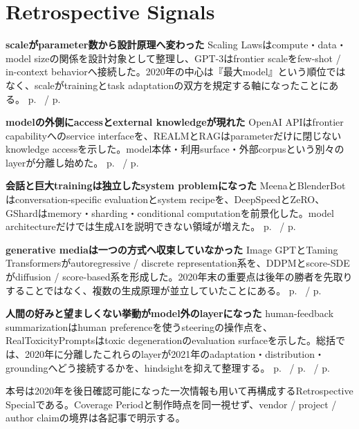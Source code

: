 \section*{Retrospective Signals}
\smallskip
\noindent \textbf{scaleがparameter数から設計原理へ変わった} Scaling Lawsはcompute・data・model sizeの関係を設計対象として整理し、GPT-3はfrontier scaleをfew-shot / in-context behaviorへ接続した。2020年の中心は『最大model』という順位ではなく、scaleがtrainingとtask adaptationの双方を規定する軸になったことにある。 \hfill{\footnotesize p.~\pageref{pkg:scale-laws-gpt3} / p.~\pageref{pkg:systems-scale}}
\par
\smallskip
\noindent \textbf{modelの外側にaccessとexternal knowledgeが現れた} OpenAI APIはfrontier capabilityへのservice interfaceを、REALMとRAGはparameterだけに閉じないknowledge accessを示した。model本体・利用surface・外部corpusという別々のlayerが分離し始めた。 \hfill{\footnotesize p.~\pageref{pkg:access-api} / p.~\pageref{pkg:retrieval-grounding}}
\par
\smallskip
\noindent \textbf{会話と巨大trainingは独立したsystem problemになった} MeenaとBlenderBotはconversation-specific evaluationとsystem recipeを、DeepSpeedとZeRO、GShardはmemory・sharding・conditional computationを前景化した。model architectureだけでは生成AIを説明できない領域が増えた。 \hfill{\footnotesize p.~\pageref{pkg:dialogue-systems} / p.~\pageref{pkg:systems-scale}}
\par
\smallskip
\noindent \textbf{generative mediaは一つの方式へ収束していなかった} Image GPTとTaming Transformersがautoregressive / discrete representation系を、DDPMとscore-SDEがdiffusion / score-based系を形成した。2020年末の重要点は後年の勝者を先取りすることではなく、複数の生成原理が並立していたことにある。 \hfill{\footnotesize p.~\pageref{pkg:media-autoregressive} / p.~\pageref{pkg:diffusion-score}}
\par
\smallskip
\noindent \textbf{人間の好みと望ましくない挙動がmodel外のlayerになった} human-feedback summarizationはhuman preferenceを使うsteeringの操作点を、RealToxicityPromptsはtoxic degenerationのevaluation surfaceを示した。総括では、2020年に分離したこれらのlayerが2021年のadaptation・distribution・groundingへどう接続するかを、hindsightを抑えて整理する。 \hfill{\footnotesize p.~\pageref{pkg:feedback-steering} / p.~\pageref{pkg:evaluation-risk} / p.~\pageref{pkg:synthesis-transition-2021}}
\par
\medskip
\begin{claimboundary}
本号は2020年を後日確認可能になった一次情報も用いて再構成するRetrospective Specialである。Coverage Periodと制作時点を同一視せず、vendor / project / author claimの境界は各記事で明示する。
\end{claimboundary}
\medskip
\tableofcontents
